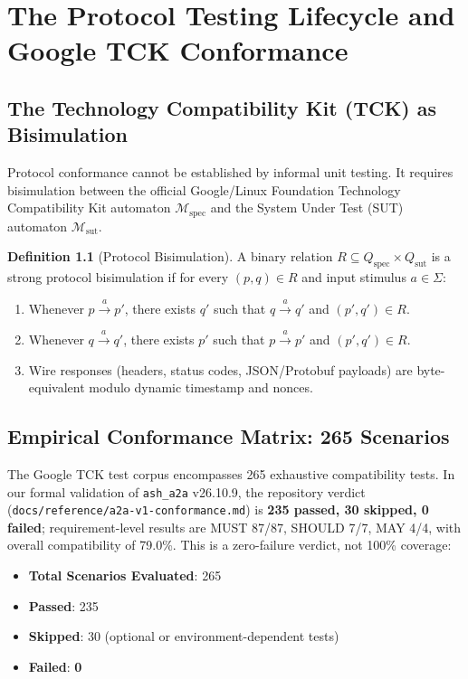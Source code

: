 \documentclass[11pt,twoside,openright]{report}
\theoremstyle{definition}
\newtheorem{definition}{Definition}[chapter]
\theoremstyle{plain}
\theoremstyle{remark}
\begin{document}
\chapter{The Protocol Testing Lifecycle and Google TCK Conformance}
\label{ch:tck}

\section{The Technology Compatibility Kit (TCK) as Bisimulation}
Protocol conformance cannot be established by informal unit testing. It requires bisimulation between the official Google/Linux Foundation Technology Compatibility Kit automaton $\mathcal{M}_{\mathrm{spec}}$ and the System Under Test (SUT) automaton $\mathcal{M}_{\mathrm{sut}}$.

\begin{definition}[Protocol Bisimulation]
A binary relation $R \subseteq Q_{\mathrm{spec}} \times Q_{\mathrm{sut}}$ is a strong protocol bisimulation if for every $(p, q) \in R$ and input stimulus $a \in \Sigma$:
\begin{enumerate}
    \item Whenever $p \xrightarrow{a} p'$, there exists $q'$ such that $q \xrightarrow{a} q'$ and $(p', q') \in R$.
    \item Whenever $q \xrightarrow{a} q'$, there exists $p'$ such that $p \xrightarrow{a} p'$ and $(p', q') \in R$.
    \item Wire responses (headers, status codes, JSON/Protobuf payloads) are byte-equivalent modulo dynamic timestamp and nonces.
\end{enumerate}
\end{definition}

\section{Empirical Conformance Matrix: 265 Scenarios}
The Google TCK test corpus encompasses 265 exhaustive compatibility tests. In our formal validation of \texttt{ash\_a2a} v26.10.9, the repository verdict (\texttt{docs/reference/a2a-v1-conformance.md}) is \textbf{235 passed, 30 skipped, 0 failed}; requirement-level results are MUST 87/87, SHOULD 7/7, MAY 4/4, with overall compatibility of 79.0\%. This is a zero-failure verdict, not 100\% coverage:
\begin{itemize}
    \item \textbf{Total Scenarios Evaluated}: 265
    \item \textbf{Passed}: 235
    \item \textbf{Skipped}: 30 (optional or environment-dependent tests)
    \item \textbf{Failed}: \textbf{0}
\end{itemize}
\end{document}
